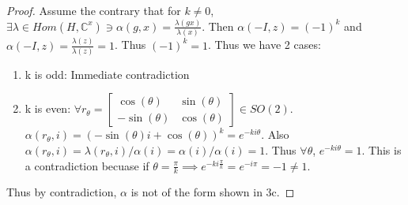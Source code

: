 \documentclass{article}
\newcommand{\C}{\mathbb{C}}
\begin{document}
\begin{proof}
    Assume the contrary that for $k \neq 0$,  $\exists \lambda \in Hom(H, \C^x) \ni \alpha(g,x) = \frac{\lambda(g x)}{\lambda(x)}$. Then $\alpha(-I, z) = (-1)^k$ and $\alpha(-I, z) = \frac{\lambda(z)}{\lambda(z)} = 1$. Thus $(-1)^k = 1$. Thus we have 2 cases:
    
    
    \begin{enumerate}
        \item k is odd: Immediate contradiction
        \item k is even: $\forall r_\theta = \begin{bmatrix}
            \cos(\theta) & \sin(\theta) \\ -\sin(\theta) & \cos(\theta)
        \end{bmatrix} \in SO(2)$. $\alpha(r_\theta, i) =  (-\sin(\theta) i + \cos(\theta))^k = e^{-ki \theta}$. Also $\alpha(r_\theta, i) = \lambda(r_\theta , i) / \alpha(i) = \alpha(i) / \alpha(i) = 1$. Thus $\forall \theta$, $e^{-ki \theta} = 1$. This is a contradiction becuase if $\theta =\frac{\pi}{k} \implies e^{-k i \frac{\pi}{k}} = e^{-i \pi} = -1 \neq 1 $.       
    \end{enumerate}

    Thus by contradiction, $\alpha$ is not of the form shown in 3c.  
    
\end{proof}
\end{document}
